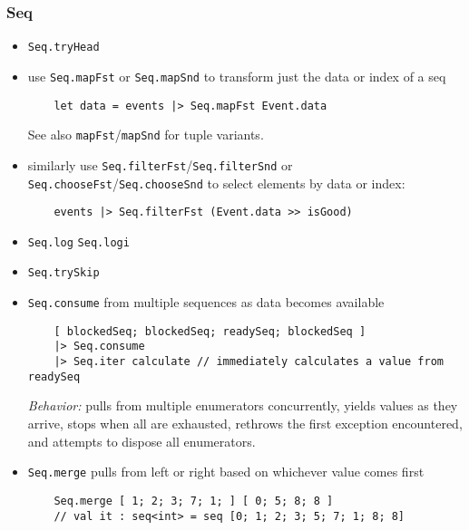 \documentclass{article}
\begin{document}
\subsubsection{Seq}

\begin{itemize}

\item \texttt{Seq.tryHead}

\item use \texttt{Seq.mapFst} or \texttt{Seq.mapSnd} to transform just the data or index of a seq
\begin{verbatim}
    let data = events |> Seq.mapFst Event.data
\end{verbatim}
\noindent See also \texttt{mapFst}/\texttt{mapSnd} for tuple variants.

\item similarly use \texttt{Seq.filterFst}/\texttt{Seq.filterSnd} or \texttt{Seq.chooseFst}/\texttt{Seq.chooseSnd} to select elements by data or index:

\begin{verbatim}
    events |> Seq.filterFst (Event.data >> isGood)
\end{verbatim}

\item \texttt{Seq.log} \texttt{Seq.logi}

\item \texttt{Seq.trySkip}

\item \texttt{Seq.consume} from multiple sequences as data becomes available
\begin{verbatim}
    [ blockedSeq; blockedSeq; readySeq; blockedSeq ]
    |> Seq.consume
    |> Seq.iter calculate // immediately calculates a value from readySeq
\end{verbatim}
\emph{Behavior:} pulls from multiple enumerators concurrently, yields values as they arrive, stops when all are exhausted, rethrows the first exception encountered, and attempts to dispose all enumerators.

\item \texttt{Seq.merge} pulls from left or right based on whichever value comes first
\begin{verbatim}
    Seq.merge [ 1; 2; 3; 7; 1; ] [ 0; 5; 8; 8 ]
    // val it : seq<int> = seq [0; 1; 2; 3; 5; 7; 1; 8; 8]
\end{verbatim}


\end{itemize}
\end{document}

